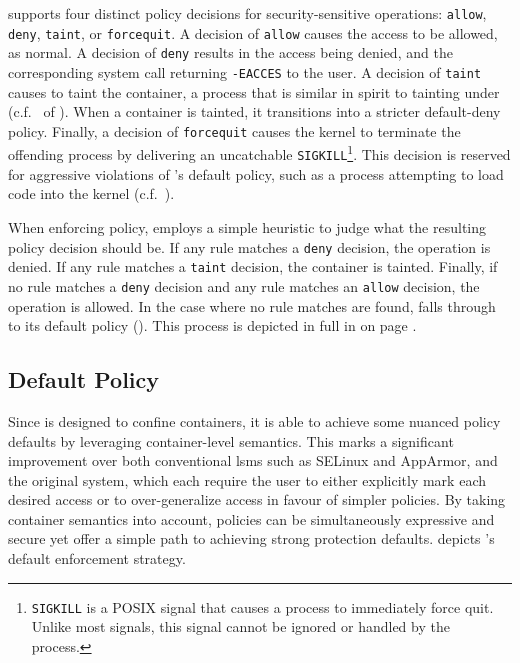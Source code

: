 \bpfcontain{} supports four distinct policy decisions for security-sensitive operations:
\texttt{allow}, \texttt{deny}, \texttt{taint}, or \texttt{forcequit}. A decision of
\texttt{allow} causes the access to be allowed, as normal. A decision of \texttt{deny}
results in the access being denied, and the corresponding system call returning
\texttt{-EACCES} to the user. A decision of \texttt{taint} causes \bpfcontain{} to taint
the container, a process that is similar in spirit to tainting under \bpfbox{}
(c.f.\  of ). When a container is tainted, it
transitions into a stricter default-deny policy. Finally, a decision of \texttt{forcequit}
causes the kernel to terminate the offending process by delivering an uncatchable
\texttt{SIGKILL}\footnote{\texttt{SIGKILL} is a POSIX signal that causes a process to
immediately force quit. Unlike most signals, this signal cannot be ignored or handled by
the process.}. This decision is reserved for aggressive violations of \bpfcontain{}'s
default policy, such as a process attempting to load code into the kernel
(c.f.\ ).

When enforcing policy, \bpfcontain{} employs a simple heuristic to judge what the
resulting policy decision should be. If any rule matches a \texttt{deny} decision, the
operation is denied. If any rule matches a \texttt{taint} decision, the container is
tainted.  Finally, if no rule matches a \texttt{deny} decision and any rule matches an
\texttt{allow} decision, the operation is allowed. In the case where no rule matches are
found, \bpfcontain{} falls through to its default policy ().
This process is depicted in full in  on page
\pageref{fig:bpfcontain-enforcement}.

\subsection{Default Policy}%
\label{ss:bpfcontain-default}

Since \bpfcontain{} is designed to confine containers, it is able to achieve some nuanced
policy defaults by leveraging container-level semantics. This marks a significant
improvement over both conventional \glspl{lsm} such as SELinux and AppArmor, and the
original \bpfbox{} system, which each require the user to either explicitly mark each
desired access or to over-generalize access in favour of simpler policies. By taking
container semantics into account, \bpfcontain{} policies can be simultaneously expressive
and secure yet offer a simple path to achieving strong protection defaults.
 depicts \bpfcontain{}'s default enforcement strategy.

